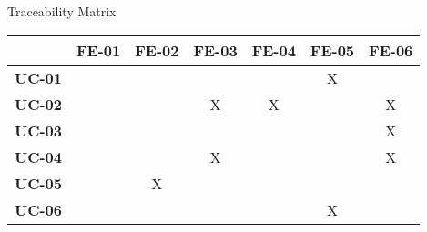 \documentclass[11pt]{article}
\begin{document}
\begin{center}
\Large Traceability Matrix\\ 
\begin{tabular}{|c|c|c|c|c|c|c|}
	\hline
	 & \textbf{FE-01} & \textbf{FE-02} & \textbf{FE-03} & \textbf{FE-04}  & \textbf{FE-05} & \textbf{FE-06} \\ \hline
	\textbf{UC-01} &  &  &  &  & X &  \\ \hline
	\textbf{UC-02} &  &  & X & X &  & X \\ \hline
	\textbf{UC-03} &  &  &  &  &  & X \\ \hline
	\textbf{UC-04} &  &  & X &  &  & X \\ \hline
	\textbf{UC-05} &  & X &  &  &  &  \\ \hline
	\textbf{UC-06} &  &  &  &  & X &  \\ \hline
\end{tabular}
\end{center}
\end{document}

